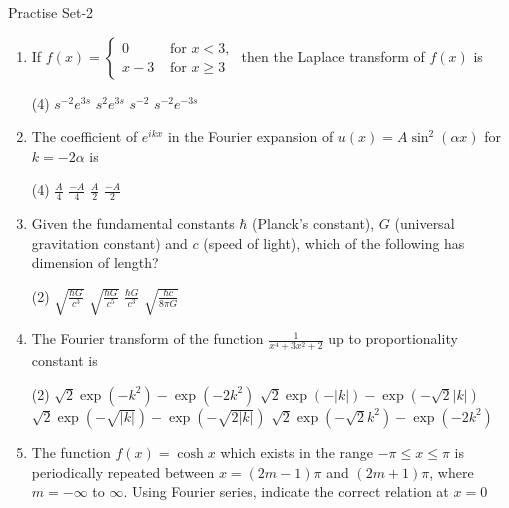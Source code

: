 \newpage
\begin{abox}
	Practise Set-2
\end{abox}
\begin{enumerate}[label=\color{ocre}\textbf{\arabic*.}]
\item If $f(x)=\left\{\begin{array}{ll}0 & \text { for } x<3, \\ x-3 & \text { for } x \geq 3\end{array}\right.$ then the Laplace transform of $f(x)$ is
{}
\begin{tasks}(4)
	\task[\textbf{A.}] $s^{-2} e^{3 s}$
	\task[\textbf{B.}] $s^{2} e^{3 s}$
	\task[\textbf{C.}] $s^{-2}$
	\task[\textbf{D.}] $s^{-2} e^{-3 s}$
\end{tasks}
\item The coefficient of $e^{i k x}$ in the Fourier expansion of $u(x)=A \sin ^{2}(\alpha x)$ for $k=-2 \alpha$ is
{}
\begin{tasks}(4)
	\task[\textbf{A.}] $\frac{A}{4}$
	\task[\textbf{B.}] $\frac{-A}{4}$
	\task[\textbf{C.}] $\frac{A}{2}$
	\task[\textbf{D.}] $\frac{-A}{2}$
\end{tasks}
\item Given the fundamental constants $\hbar$ (Planck's constant), $G$ (universal gravitation constant) and $c$ (speed of light), which of the following has dimension of length?
{}
 \begin{tasks}(2)
	\task[\textbf{A.}]$\sqrt{\frac{\hbar G}{c^{3}}}$
	\task[\textbf{B.}] $\sqrt{\frac{\hbar G}{c^{5}}}$
	\task[\textbf{C.}]$\frac{\hbar G}{c^{3}}$
	\task[\textbf{D.}] $\sqrt{\frac{\hbar c}{8 \pi G}}$
\end{tasks}
\item The Fourier transform of the function $\frac{1}{x^{4}+3 x^{2}+2}$ up to proportionality constant is
{}
 \begin{tasks}(2)
	\task[\textbf{A.}]$\sqrt{2} \exp \left(-k^{2}\right)-\exp \left(-2 k^{2}\right)$
	\task[\textbf{B.}]$\sqrt{2} \exp (-|k|)-\exp (-\sqrt{2}|k|)$
	\task[\textbf{C.}]$\sqrt{2} \exp (-\sqrt{|k|})-\exp (-\sqrt{2|k|})$
	\task[\textbf{D.}]  $\sqrt{2} \exp \left(-\sqrt{2} k^{2}\right)-\exp \left(-2 k^{2}\right)$
\end{tasks}
\item The function $f(x)=\cosh x$ which exists in the range $-\pi \leq x \leq \pi$ is periodically repeated between $x=(2 m-1) \pi$ and $(2 m+1) \pi$, where $m=-\infty$ to $\infty$. Using Fourier series, indicate the correct relation at $x=0$

\end{enumerate}
